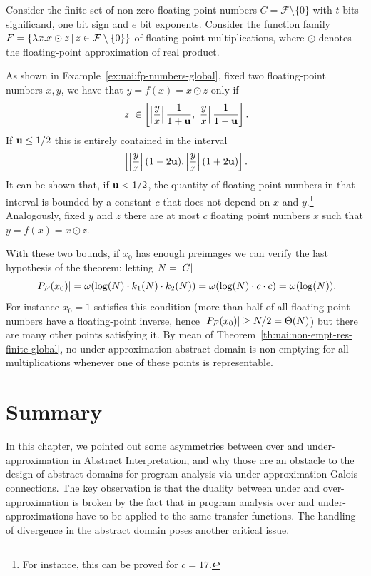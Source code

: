 \begin{example}
	Consider the finite set of non-zero floating-point numbers $C = \mathcal{F} \setminus \{ 0 \}$ with $t$ bits significand, one bit sign and $e$ bit exponents.
	Consider the function family $F = \{ \lambda x . x \odot z \,\vert\, z \in \mathcal{F} \setminus \{ 0 \} \}$ of floating-point multiplications, where $\odot$ denotes the floating-point approximation of real product.

	As shown in Example~\ref{ex:uai:fp-numbers-global}, fixed two floating-point numbers $x, y$, we have that $y = f(x) = x \odot z$ only if
	\[
	\lvert z\rvert \in \left[ \left\lvert\frac{y}{x}\right\rvert \frac{1}{1+\textbf{u}}, \left\lvert\frac{y}{x}\right\rvert \frac{1}{1-\textbf{u}} \right] .
	\]
	If $\textbf{u} \le 1 / 2$ this is entirely contained in the interval
	\[
	\left[ \left\lvert\frac{y}{x}\right\rvert (1 - 2 \textbf{u}), \left\lvert\frac{y}{x}\right\rvert (1 + 2 \textbf{u}) \right] \text{.}
	\]
	It can be shown that, if $\textbf{u} < 1 / 2$, the quantity of floating point numbers in that interval is bounded by a constant $c$ that does not depend on $x$ and $y$.\footnote{For instance, this can be proved for $c = 17$.}
	Analogously, fixed $y$ and $z$ there are at most $c$ floating point numbers $x$ such that $y = f(x) = x \odot z$.

	With these two bounds, if $x_0$ has enough preimages we can verify the last hypothesis of the theorem: letting $N = \lvert C\rvert$
	\[
	\lvert P_F(x_0)\rvert = \omega(\log(N) \cdot k_1(N) \cdot k_2(N)) = \omega(\log(N) \cdot c \cdot c) = \omega(\log(N)) .
	\]
	For instance $x_0 = 1$ satisfies this condition (more than half of all floating-point numbers have a floating-point inverse, hence $\lvert P_F(x_0)\rvert \ge N / 2 = \Theta(N)$) but there are many other points satisfying it.
	By mean of Theorem~\ref{th:uai:non-empt-res-finite-global}, no under-approximation abstract domain is non-emptying for all multiplications whenever one of these points is representable.
\end{example}

\section{Summary}
In this chapter, we pointed out some asymmetries between over and under-approximation in Abstract Interpretation, and why those are an obstacle to the design of abstract domains for program analysis via under-approximation Galois connections. The key observation is that the duality between under and over-approximation is broken by the fact that in program analysis over and under-approximations have to be applied to the same transfer functions. The handling of divergence in the abstract domain poses another critical issue.

